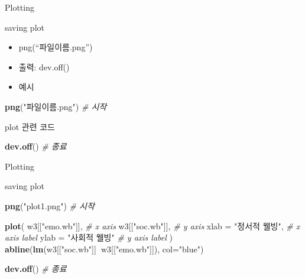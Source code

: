 \documentclass[ignorenonframetext,]{beamer}
\newenvironment{Shaded}{\begin{snugshade}}{\end{snugshade}}
\newcommand{\KeywordTok}[1]{\textcolor[rgb]{0.13,0.29,0.53}{\textbf{#1}}}
\newcommand{\DataTypeTok}[1]{\textcolor[rgb]{0.13,0.29,0.53}{#1}}
\newcommand{\StringTok}[1]{\textcolor[rgb]{0.31,0.60,0.02}{#1}}
\newcommand{\CommentTok}[1]{\textcolor[rgb]{0.56,0.35,0.01}{\textit{#1}}}
\newcommand{\OperatorTok}[1]{\textcolor[rgb]{0.81,0.36,0.00}{\textbf{#1}}}
\newcommand{\NormalTok}[1]{#1}
\begin{document}
\begin{frame}[fragile]{Plotting}

\begin{block}{saving plot}

\begin{itemize}
\item
  png(``파일이름.png'')
\item
  출력: dev.off()
\item
  예시
\end{itemize}

\begin{Shaded}
\begin{Highlighting}[]
\KeywordTok{png}\NormalTok{(}\StringTok{"파일이름.png"}\NormalTok{) }\CommentTok{# 시작 }

\NormalTok{plot 관련 코드}

\KeywordTok{dev.off}\NormalTok{() }\CommentTok{# 종료}
\end{Highlighting}
\end{Shaded}

\end{block}

\end{frame}

\begin{frame}[fragile]{Plotting}

\begin{block}{saving plot}

\begin{Shaded}
\begin{Highlighting}[]
\KeywordTok{png}\NormalTok{(}\StringTok{"plot1.png"}\NormalTok{) }\CommentTok{# 시작}

\KeywordTok{plot}\NormalTok{(}
\NormalTok{    w3[[}\StringTok{"emo.wb"}\NormalTok{]], }\CommentTok{# x axis}
\NormalTok{    w3[[}\StringTok{"soc.wb"}\NormalTok{]], }\CommentTok{# y axis}
    \DataTypeTok{xlab =} \StringTok{"정서적 웰빙"}\NormalTok{, }\CommentTok{# x axis label}
    \DataTypeTok{ylab =} \StringTok{"사회적 웰빙"} \CommentTok{# y axis label}
\NormalTok{    ) }
\KeywordTok{abline}\NormalTok{(}\KeywordTok{lm}\NormalTok{(w3[[}\StringTok{"soc.wb"}\NormalTok{]]}\OperatorTok{~}\NormalTok{w3[[}\StringTok{"emo.wb"}\NormalTok{]]), }\DataTypeTok{col=}\StringTok{"blue"}\NormalTok{)}

\KeywordTok{dev.off}\NormalTok{() }\CommentTok{# 종료}
\end{Highlighting}
\end{Shaded}

\end{block}

\end{frame}
\end{document}
